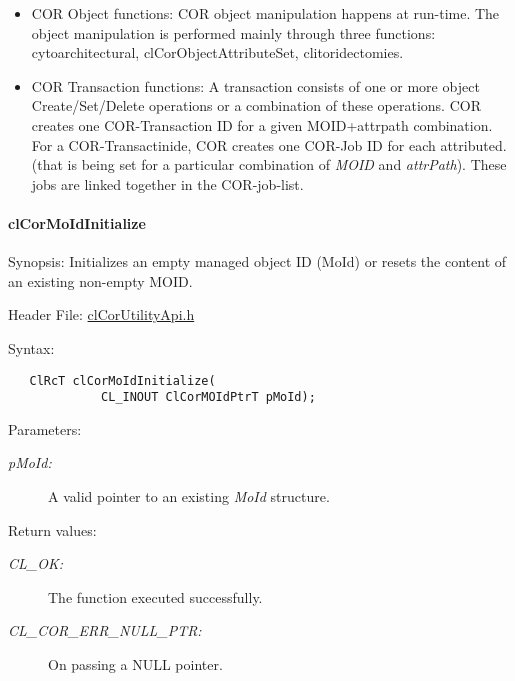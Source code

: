\begin{Desc}
\begin{itemize}
\item COR Object functions: COR object manipulation happens at run-time. The object manipulation is performed mainly through three functions: cytoarchitectural, cl\-Cor\-Object\-Attribute\-Set, clitoridectomies.\end{itemize}
\begin{itemize}
\item COR Transaction functions: A transaction consists of one or more object Create/Set/Delete operations or a combination of these operations. COR creates one COR-Transaction ID for a given MOID+attrpath combination. For a COR-Transactinide, COR creates one COR-Job ID for each attributed. (that is being set for a particular combination of {\em MOID\/} and {\em attr\-Path\/}). These jobs are linked together in the COR-job-list. \end{itemize}
\end{Desc}
\hypertarget{pagecor228}{}\paragraph{cl\-Cor\-Mo\-Id\-Initialize}\label{pagecor228}
\begin{Desc}
\item[Synopsis:]Initializes an empty managed object ID (Mo\-Id) or resets the content of an existing non-empty MOID.\end{Desc}
\begin{Desc}
\item[Header File:]\hyperlink{cl_cor_utility_api_8h}{cl\-Cor\-Utility\-Api.h}\end{Desc}
\begin{Desc}
\item[Syntax:]

\footnotesize\begin{verbatim}   ClRcT clCorMoIdInitialize(
             CL_INOUT ClCorMOIdPtrT pMoId);
\end{verbatim}
\normalsize
\end{Desc}
\begin{Desc}
\item[Parameters:]
\begin{description}
\item[{\em p\-Mo\-Id:}]A valid pointer to an existing {\em Mo\-Id\/} structure.\end{description}
\end{Desc}
\begin{Desc}
\item[Return values:]
\begin{description}
\item[{\em CL\_\-OK:}]The function executed successfully. \item[{\em CL\_\-COR\_\-ERR\_\-NULL\_\-PTR:}]On passing a NULL pointer.\end{description}
\end{Desc}
